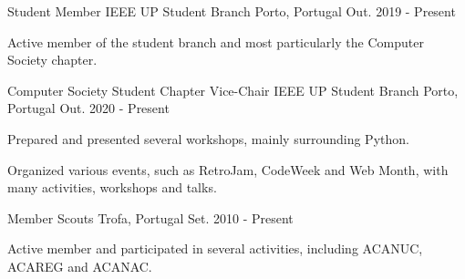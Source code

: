 
\begin{cventries}
	\cventry
		{Student Member} 
		{IEEE UP Student Branch} 
		{Porto, Portugal}
		{Out. 2019 - Present} 
		{
			\begin{cvitems} 
				\item {Active member of the student branch and most particularly the Computer Society chapter.}
			\end{cvitems}
		}
		
	\cventry
		{Computer Society Student Chapter Vice-Chair} 
		{IEEE UP Student Branch} 
		{Porto, Portugal}
		{Out. 2020 - Present} 
		{
			\begin{cvitems} 
				\item {Prepared and presented several workshops, mainly surrounding Python.}
				\item {Organized various events, such as RetroJam, CodeWeek and Web Month, with many activities, workshops and talks.}
			\end{cvitems}
		}
		
	\cventry
		{Member} 
		{Scouts} 
		{Trofa, Portugal}
		{Set. 2010 - Present} 
		{
			\begin{cvitems} 
				\item {Active member and participated in several activities, including ACANUC, ACAREG and ACANAC.}
			\end{cvitems}
		}
\end{cventries}
